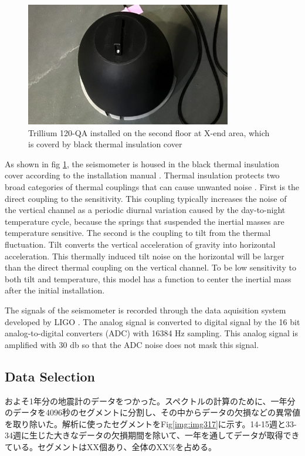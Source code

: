\begin{figure}[h]
  \begin{center}   
    \includegraphics[width=9.0cm]{./img_chap3/img316.png}
    \caption{Trillium 120-QA installed on the second floor at X-end area, which is coverd by black thermal insulation cover}\label{img:img316}
  \end{center}
\end{figure}

As shown in fig \ref{img:img316}, the seismometer is housed in the black thermal insulation cover according to the installation manual \cite{trillium120manual}. Thermal insulation protects two broad categories of thermal couplings that can cause unwanted noise \cite{trillium120manual}. First is the direct coupling to the sensitivity. This coupling typically increases the noise of the vertical channel as a periodic diurnal variation caused by the day-to-night temperature cycle, because the springs that suspended the inertial masses are temperature sensitive. The second is the coupling to tilt from the thermal fluctuation. Tilt converts the vertical acceleration of gravity into horizontal acceleration. This thermally induced tilt noise on the horizontal will be larger than the direct thermal coupling on the vertical channel. To be low sensitivity to both tilt and temperature, this model has a function to center the inertial mass after the initial installation.

The signals of the seismometer is recorded through the data aquisition system developed by LIGO \cite{bork2001overview}. The analog signal is converted to digital signal by the 16 bit analog-to-digital converters (ADC) with 16384 $\mathrm{Hz}$ sampling. This analog signal is amplified with 30 db so that the ADC noise does not mask this signal. 



\subsection{Data Selection}
およそ1年分の地震計のデータをつかった。スペクトルの計算のために、一年分のデータを4096秒のセグメントに分割し、その中からデータの欠損などの異常値を取り除いた。解析に使ったセグメントをFig\ref{img:img317}に示す。14-15週と33-34週に生じた大きなデータの欠損期間を除いて、一年を通してデータが取得できている。セグメントはXX個あり、全体のXX\%を占める。

